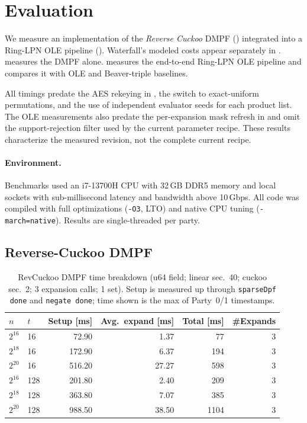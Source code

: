 \section{Evaluation}\label{sec:eval}

We measure an implementation of the \emph{Reverse Cuckoo} DMPF
() integrated into a Ring-LPN OLE pipeline
(). Waterfall's modeled costs appear separately in
.
 measures the DMPF alone.
 measures the end-to-end Ring-LPN OLE pipeline
and compares it with OLE and Beaver-triple baselines.

All timings predate the AES rekeying in ,
the switch to exact-uniform permutations, and the use of independent
evaluator seeds for each product list.
The OLE measurements also predate the per-expansion mask refresh in
 and omit the support-rejection filter used by
the current parameter recipe. These results characterize the measured
revision, not the complete current recipe.

\paragraph{Environment.}
Benchmarks used an i7-13700H CPU with 32\,GB DDR5 memory and local sockets
with sub-millisecond latency and bandwidth above 10\,Gbps.
All code was compiled with full optimizations (\texttt{-O3}, LTO) and native CPU tuning
(\texttt{-march=native}). Results are single-threaded per party.


\subsection{Reverse-Cuckoo DMPF}\label{sec:RevCuckooPerf}

\begin{table}[t]
\centering
\caption{RevCuckoo DMPF time breakdown (u64 field; linear sec.\ 40; cuckoo sec.\ 2; 3 expansion calls; 1 set). Setup is measured up through \texttt{sparseDpf done} and \texttt{negate done}; time shown is the max of Party~0/1 timestamps.}
\label{tab:dmpf-time-split}
\small
\begin{tabular}{@{}llrrrr@{}}
\toprule
$n$ & $t$ & Setup [ms] & Avg.\ expand [ms] & Total [ms] & \#Expands \\
\midrule
$2^{16}$ & 16  & 72.90  & 1.37  & 77   & 3 \\
$2^{18}$ & 16  & 172.90 & 6.37  & 194  & 3 \\
$2^{20}$ & 16  & 516.20 & 27.27 & 598  & 3 \\
\midrule
$2^{16}$ & 128 & 201.80 & 2.40  & 209  & 3 \\
$2^{18}$ & 128 & 363.80 & 7.07  & 385  & 3 \\
$2^{20}$ & 128 & 988.50 & 38.50 & 1104 & 3 \\
\bottomrule
\end{tabular}

\end{table}

